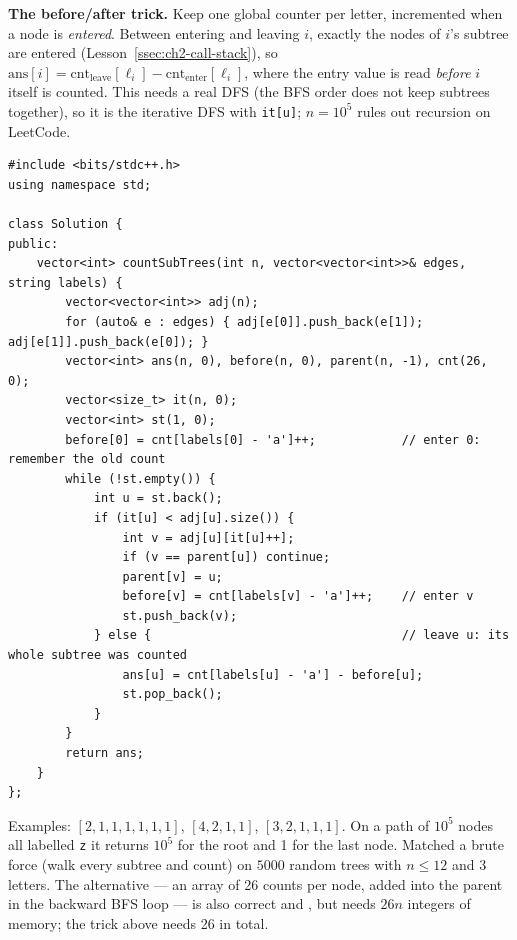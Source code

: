 \begin{solutionbox}
\textbf{The before/after trick.} Keep one global counter per letter, incremented when a node is \emph{entered}. Between entering and leaving $i$, exactly the nodes of $i$'s subtree are entered (Lesson~\ref{ssec:ch2-call-stack}), so $\mathrm{ans}[i] = \mathrm{cnt}_{\text{leave}}[\ell_i] - \mathrm{cnt}_{\text{enter}}[\ell_i]$, where the entry value is read \emph{before} $i$ itself is counted. This needs a real DFS (the BFS order does not keep subtrees together), so it is the iterative DFS with \texttt{it[u]}; $n = 10^5$ rules out recursion on LeetCode.
\begin{center}
\end{center}
\begin{lstlisting}[style=cpp]
#include <bits/stdc++.h>
using namespace std;

class Solution {
public:
    vector<int> countSubTrees(int n, vector<vector<int>>& edges, string labels) {
        vector<vector<int>> adj(n);
        for (auto& e : edges) { adj[e[0]].push_back(e[1]); adj[e[1]].push_back(e[0]); }
        vector<int> ans(n, 0), before(n, 0), parent(n, -1), cnt(26, 0);
        vector<size_t> it(n, 0);
        vector<int> st(1, 0);
        before[0] = cnt[labels[0] - 'a']++;            // enter 0: remember the old count
        while (!st.empty()) {
            int u = st.back();
            if (it[u] < adj[u].size()) {
                int v = adj[u][it[u]++];
                if (v == parent[u]) continue;
                parent[v] = u;
                before[v] = cnt[labels[v] - 'a']++;    // enter v
                st.push_back(v);
            } else {                                   // leave u: its whole subtree was counted
                ans[u] = cnt[labels[u] - 'a'] - before[u];
                st.pop_back();
            }
        }
        return ans;
    }
};
\end{lstlisting}
Examples: $[2,1,1,1,1,1,1]$, $[4,2,1,1]$, $[3,2,1,1,1]$. On a path of $10^5$ nodes all labelled \texttt{z} it returns $10^5$ for the root and 1 for the last node. Matched a brute force (walk every subtree and count) on $5000$ random trees with $n \le 12$ and 3 letters. The alternative --- an array of 26 counts per node, added into the parent in the backward BFS loop --- is also correct and , but needs $26n$ integers of memory; the trick above needs 26 in total.
\end{solutionbox}


